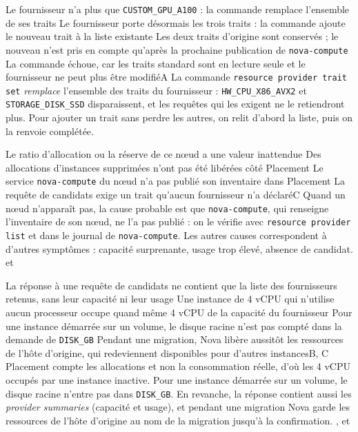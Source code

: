   {Le fournisseur n'a plus que \texttt{CUSTOM\_GPU\_A100} : la commande remplace l'ensemble de ses traits}
  {Le fournisseur porte désormais les trois traits : la commande ajoute le nouveau trait à la liste existante}
  {Les deux traits d'origine sont conservés ; le nouveau n'est pris en compte qu'après la prochaine publication de \texttt{nova-compute}}
  {La commande échoue, car les traits standard sont en lecture seule et le fournisseur ne peut plus être modifié}{A}
  {La commande \texttt{resource provider trait set} \emph{remplace} l'ensemble des traits du fournisseur : \texttt{HW\_CPU\_X86\_AVX2} et \texttt{STORAGE\_DISK\_SSD} disparaissent, et les requêtes qui les exigent ne le retiendront plus. Pour ajouter un trait sans perdre les autres, on relit d'abord la liste, puis on la renvoie complétée.}
  {}

  {Le ratio d'allocation ou la réserve de ce nœud a une valeur inattendue}
  {Des allocations d'instances supprimées n'ont pas été libérées côté Placement}
  {Le service \texttt{nova-compute} du nœud n'a pas publié son inventaire dans Placement}
  {La requête de candidats exige un trait qu'aucun fournisseur n'a déclaré}{C}
  {Quand un nœud n'apparaît pas, la cause probable est que \texttt{nova-compute}, qui renseigne l'inventaire de son nœud, ne l'a pas publié : on le vérifie avec \texttt{resource provider list} et dans le journal de \texttt{nova-compute}. Les autres causes correspondent à d'autres symptômes : capacité surprenante, usage trop élevé, absence de candidat.}
  { et }

  {La réponse à une requête de candidats ne contient que la liste des fournisseurs retenus, sans leur capacité ni leur usage}
  {Une instance de 4 vCPU qui n'utilise aucun processeur occupe quand même 4 vCPU de la capacité du fournisseur}
  {Pour une instance démarrée sur un volume, le disque racine n'est pas compté dans la demande de \texttt{DISK\_GB}}
  {Pendant une migration, Nova libère aussitôt les ressources de l'hôte d'origine, qui redeviennent disponibles pour d'autres instances}{B, C}
  {Placement compte les allocations et non la consommation réelle, d'où les 4 vCPU occupés par une instance inactive. Pour une instance démarrée sur un volume, le disque racine n'entre pas dans \texttt{DISK\_GB}. En revanche, la réponse contient aussi les \emph{provider summaries} (capacité et usage), et pendant une migration Nova garde les ressources de l'hôte d'origine au nom de la migration jusqu'à la confirmation.}
  {,  et }

